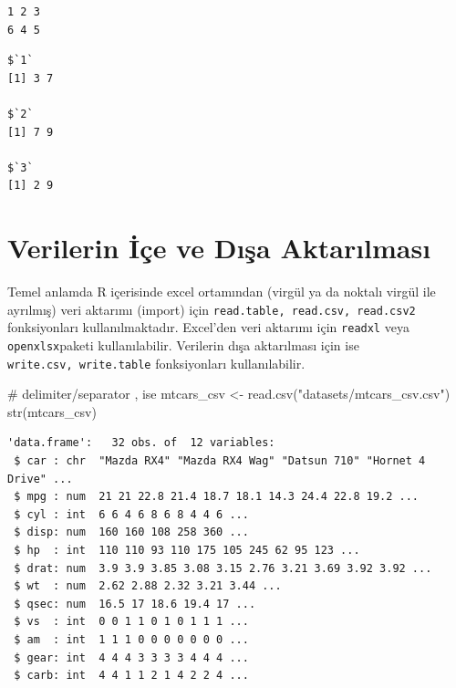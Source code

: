 \documentclass[
  letterpaper,
  DIV=11,
  numbers=noendperiod]{scrreprt}
\newenvironment{Shaded}{\begin{snugshade}}{\end{snugshade}}
\newcommand{\AttributeTok}[1]{\textcolor[rgb]{0.40,0.45,0.13}{#1}}
\newcommand{\CommentTok}[1]{\textcolor[rgb]{0.37,0.37,0.37}{#1}}
\newcommand{\FunctionTok}[1]{\textcolor[rgb]{0.28,0.35,0.67}{#1}}
\newcommand{\NormalTok}[1]{\textcolor[rgb]{0.00,0.23,0.31}{#1}}
\newcommand{\OtherTok}[1]{\textcolor[rgb]{0.00,0.23,0.31}{#1}}
\newcommand{\SpecialCharTok}[1]{\textcolor[rgb]{0.37,0.37,0.37}{#1}}
\newcommand{\StringTok}[1]{\textcolor[rgb]{0.13,0.47,0.30}{#1}}
\begin{document}
\begin{verbatim}
1 2 3 
6 4 5 
\end{verbatim}

\begin{Shaded}
\end{Shaded}

\begin{verbatim}
$`1`
[1] 3 7

$`2`
[1] 7 9

$`3`
[1] 2 9
\end{verbatim}

\hypertarget{verilerin-iuxe7e-ve-dux131ux15fa-aktarux131lmasux131}{%
\chapter{Verilerin İçe ve Dışa
Aktarılması}\label{verilerin-iuxe7e-ve-dux131ux15fa-aktarux131lmasux131}}

Temel anlamda R içerisinde excel ortamından (virgül ya da noktalı virgül
ile ayrılmış) veri aktarımı (import) için
\texttt{read.table,\ read.csv,\ read.csv2} fonksiyonları
kullanılmaktadır. Excel'den veri aktarımı için \texttt{readxl} veya
\texttt{openxlsx}paketi kullanılabilir. Verilerin dışa aktarılması için
ise \texttt{write.csv,\ write.table} fonksiyonları kullanılabilir.

\begin{Shaded}
\begin{Highlighting}[]
\CommentTok{\# delimiter/separator , ise}
\NormalTok{mtcars\_csv }\OtherTok{\textless{}{-}} \FunctionTok{read.csv}\NormalTok{(}\StringTok{"datasets/mtcars\_csv.csv"}\NormalTok{)}
\FunctionTok{str}\NormalTok{(mtcars\_csv)}
\end{Highlighting}
\end{Shaded}

\begin{verbatim}
'data.frame':   32 obs. of  12 variables:
 $ car : chr  "Mazda RX4" "Mazda RX4 Wag" "Datsun 710" "Hornet 4 Drive" ...
 $ mpg : num  21 21 22.8 21.4 18.7 18.1 14.3 24.4 22.8 19.2 ...
 $ cyl : int  6 6 4 6 8 6 8 4 4 6 ...
 $ disp: num  160 160 108 258 360 ...
 $ hp  : int  110 110 93 110 175 105 245 62 95 123 ...
 $ drat: num  3.9 3.9 3.85 3.08 3.15 2.76 3.21 3.69 3.92 3.92 ...
 $ wt  : num  2.62 2.88 2.32 3.21 3.44 ...
 $ qsec: num  16.5 17 18.6 19.4 17 ...
 $ vs  : int  0 0 1 1 0 1 0 1 1 1 ...
 $ am  : int  1 1 1 0 0 0 0 0 0 0 ...
 $ gear: int  4 4 4 3 3 3 3 4 4 4 ...
 $ carb: int  4 4 1 1 2 1 4 2 2 4 ...
\end{verbatim}
\end{document}
